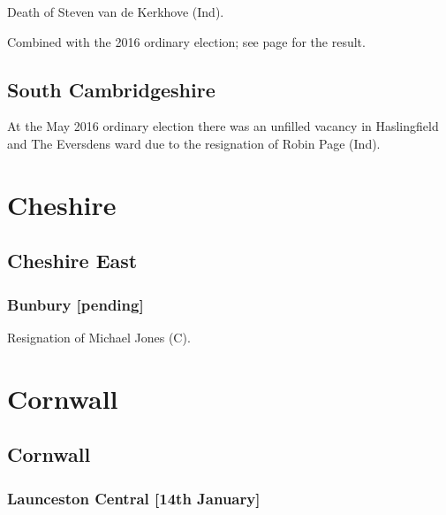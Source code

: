 \documentclass[a4paper,openany]{book}
\begin{document}
\begin{resultsiii}

Death of Steven van de Kerkhove (Ind).

Combined with the 2016 ordinary election; see page \pageref{StNeotsEynesburyHuntingdonshire} for the result.

\subsection*{South Cambridgeshire}

At the May 2016 ordinary election there was an unfilled vacancy in Haslingfield and The Eversdens ward due to the resignation of Robin Page (Ind).

\section{Cheshire}

\subsection*{Cheshire East}

\subsubsection*{Bunbury \hspace*{\fill}\nolinebreak[1]%
\enspace\hspace*{\fill}
[pending]}


Resignation of Michael Jones (C).

\section{Cornwall}

\subsection*{Cornwall}

\subsubsection*{Launceston Central \hspace*{\fill}\nolinebreak[1]%
\enspace\hspace*{\fill}
[14th January]}


\end{resultsiii}
\end{document}

